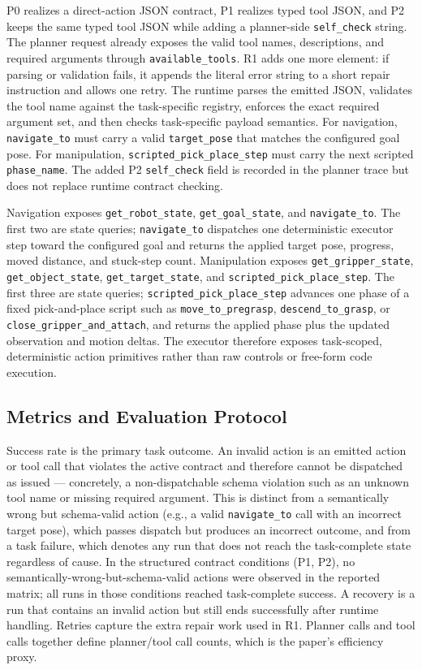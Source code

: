 P0 realizes a direct-action JSON contract, P1 realizes typed tool JSON, and
P2 keeps the same typed tool JSON while adding a planner-side
\texttt{self\_check} string. The planner request already exposes the valid tool
names, descriptions, and required arguments through \texttt{available\_tools}.
R1 adds one more element: if parsing or validation fails, it appends the
literal error string to a short repair instruction and allows one retry. The
runtime parses the emitted JSON, validates the tool name against the
task-specific registry, enforces the exact required argument set, and then
checks task-specific payload semantics. For navigation,
\texttt{navigate\_to} must carry a valid \texttt{target\_pose} that matches the
configured goal pose. For manipulation,
\texttt{scripted\_pick\_place\_step} must carry the next scripted
\texttt{phase\_name}. The added P2 \texttt{self\_check} field is recorded in the
planner trace but does not replace runtime contract checking.

Navigation exposes \texttt{get\_robot\_state}, \texttt{get\_goal\_state}, and
\texttt{navigate\_to}. The first two are state queries; \texttt{navigate\_to}
dispatches one deterministic executor step toward the configured goal and
returns the applied target pose, progress, moved distance, and stuck-step
count. Manipulation exposes \texttt{get\_gripper\_state},
\texttt{get\_object\_state}, \texttt{get\_target\_state}, and
\texttt{scripted\_pick\_place\_step}. The first three are state queries;
\texttt{scripted\_pick\_place\_step} advances one phase of a fixed pick-and-place
script such as \texttt{move\_to\_pregrasp}, \texttt{descend\_to\_grasp}, or
\texttt{close\_gripper\_and\_attach}, and returns the applied phase plus the
updated observation and motion deltas. The executor therefore exposes
task-scoped, deterministic action primitives rather than raw controls or
free-form code execution.

\subsection{Metrics and Evaluation Protocol}

Success rate is the primary task outcome. An invalid action is an emitted
action or tool call that violates the active contract and therefore cannot be
dispatched as issued --- concretely, a non-dispatchable schema violation such
as an unknown tool name or missing required argument. This is distinct from a
semantically wrong but schema-valid action (e.g., a valid
\texttt{navigate\_to} call with an incorrect target pose), which passes
dispatch but produces an incorrect outcome, and from a task failure, which
denotes any run that does not reach the task-complete state regardless of
cause. In the structured contract conditions (P1, P2), no
semantically-wrong-but-schema-valid actions were observed in the reported
matrix; all runs in those conditions reached task-complete success.
A recovery is a run that contains an invalid action but
still ends successfully after runtime handling. Retries capture the extra
repair work used in R1. Planner calls and tool calls together define
planner/tool call counts, which is the paper's efficiency proxy.

